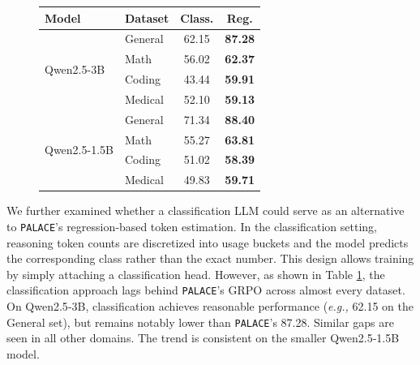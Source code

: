 \documentclass[pdflatex,sn-mathphys-num]{sn-jnl}%
\newcommand{\eg}{\textit{e.g., }}
\newcommand{\n}{\texttt{PALACE}\xspace}
\theoremstyle{thmstyleone}%
\theoremstyle{thmstyletwo}%
\theoremstyle{thmstylethree}%
\begin{document}
\begin{figure}
\centering
\footnotesize
\setlength{\tabcolsep}{4pt}
\renewcommand{\arraystretch}{1.08}

\label{tab:tree}

\begin{tabular}{@{}llcc@{}}
\toprule
\textbf{Model}
&
\textbf{Dataset}
&
\textbf{Class.}
&
\textbf{Reg.}
\\
\midrule

\multirow{4}{*}{Qwen2.5-3B}
& General & 62.15 & \textbf{87.28} \\
& Math    & 56.02 & \textbf{62.37} \\
& Coding  & 43.44 & \textbf{59.91} \\
& Medical & 52.10 & \textbf{59.13} \\

\midrule

\multirow{4}{*}{Qwen2.5-1.5B}
& General & 71.34 & \textbf{88.40} \\
& Math    & 55.27 & \textbf{63.81} \\
& Coding  & 51.02 & \textbf{58.39} \\
& Medical & 49.83 & \textbf{59.71} \\

\bottomrule
\end{tabular}

\vspace{-15pt}
\end{figure}
We further examined whether a classification LLM could serve as an alternative to {\n}’s regression‑based token estimation. In the classification setting, reasoning token counts are discretized into usage buckets and the model predicts the corresponding class rather than the exact number. This design allows training by simply attaching a classification head.
However, as shown in Table \ref{tab:tree}, the classification approach lags behind {\n}’s GRPO across almost every dataset. On Qwen2.5‑3B, classification achieves reasonable performance (\eg 62.15 on the General set), but remains notably lower than {\n}’s 87.28. Similar gaps are seen in all other domains. The trend is consistent on the smaller Qwen2.5‑1.5B model.
\end{document}
